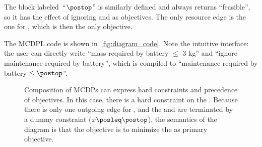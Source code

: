 \noindent The block labeled~``$\postop$'' is similarly defined and
always returns ``feasible'', so it has the effect of ignoring 
and  as objectives. The only resource edge is the
one for , which is then the only objective.

The MCDPL code is shown in~\cref{fig:diagram_code}. Note the intuitive
interface: the user can directly write ``mass required by battery
$\leq$ 3 kg'' and ``ignore maintenance required by battery'',
which is compiled to ``maintenance required by battery $\leq\postop$''.

\begin{figure}
    \begin{centering}
    \end{centering}
    \begin{centering}
    \end{centering}
    \smallskip{}

    \caption{Composition of MCDPs can express hard constraints and precedence of
    objectives. In this case, there is a hard constraint on the .
    Because there is only one outgoing edge for , and the 
    and  are terminated by a dummy constraint ($x\posleq\postop$),
        the semantics of the diagram is that the objective is to minimize
        the  as primary objective.}
\end{figure}

